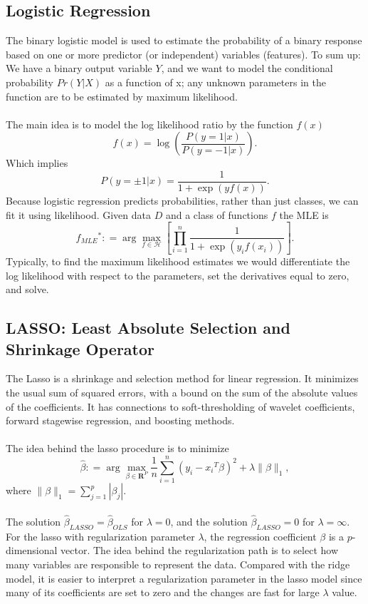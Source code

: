 \documentclass{article} %
\begin{document}
\subsection{Logistic Regression}
The binary logistic model is used to estimate the probability of a binary response based on one or more predictor (or independent) variables (features). To sum up: We have a binary output variable $Y$, and we want to model the conditional probability $Pr(Y|X)$ as a function of x; any unknown parameters in the function are to be estimated by maximum likelihood. \\\\
The main idea is to model the log likelihood ratio by the function $f(x)$
\begin{equation}
f(x)=\log(\frac{P(y=1|x)}{P(y=-1|x)}).
\end{equation}
Which implies
\begin{equation}
P(y=\pm1|x)=\frac{1}{1+\exp(yf(x))}.
\end{equation}
Because logistic regression predicts probabilities, rather than just classes, we can fit it using likelihood. Given data $D$ and a class of functions $f$ the MLE is
\begin{equation}
f_{MLE}{}^{*}\colon=\arg\max_{f\in\mathcal{H}}[\prod_{i=1}^{n}\frac{1}{1+\exp(y_if(x_i))}].
\end{equation}
Typically, to find the maximum likelihood estimates we would differentiate the log likelihood with respect to the parameters, set the derivatives equal to zero, and solve.

\subsection{LASSO: Least Absolute Selection and Shrinkage Operator}
The Lasso is a shrinkage and selection method for linear regression. It minimizes the usual sum of squared errors, with a bound on the sum of the absolute values of the coefficients. It has connections to soft-thresholding of wavelet coefficients, forward stagewise regression, and boosting methods. \\\\
The idea behind the lasso procedure is to minimize
\begin{equation}
\hat{\beta}\colon=\arg\max_{\beta\in\textbf{R}^P}\frac{1}{n}\sum_{i=1}^{n}(y_i-x_i{}^T\beta)^2+\lambda\|\beta\|_1,
\end{equation}
where $\|\beta\|_1=\sum_{j=1}^{p}|\beta_j|$. \\\\
The solution $\hat{\beta}_{LASSO}=\hat{\beta}_{OLS}$ for $\lambda=0$, and the solution $\hat{\beta}_{LASSO}=0$ for $\lambda=\infty$. For the lasso with regularization parameter $\lambda$, the regression coefficient $\beta$ is a $p$-dimensional vector. The idea behind the regularization path is to select how many variables are responsible to represent the data. Compared with the ridge model, it is easier to interpret a regularization parameter in the lasso model since many of its coefficients are set to zero and the changes are fast for large $\lambda$ value.
\end{document}
